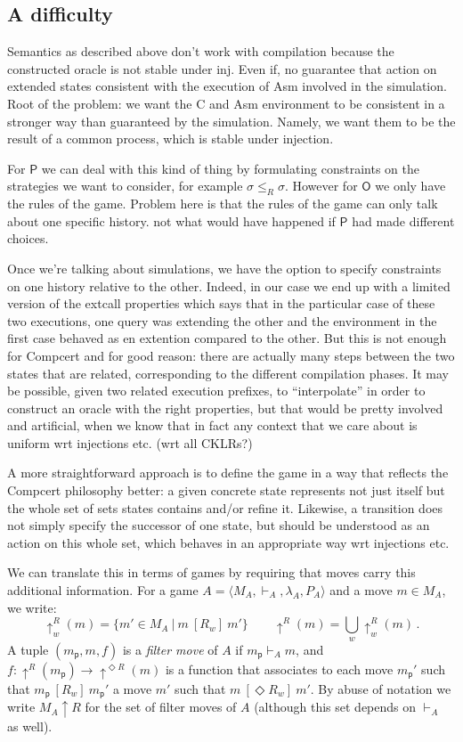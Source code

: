 \documentclass[acmsmall,anonymous]{acmart}
\newcommand{\kw}[1]{\ensuremath{ \textsf{#1} }}
\newcommand{\ifr}[1]{\ [{#1}]\ }
\begin{document}
\subsection{A difficulty}

Semantics as described above
don't work with compilation
because the constructed oracle is not stable under inj.
Even if,
no guarantee that action on extended states consistent
with the execution of Asm involved in the simulation.
Root of the problem:
we want the C and Asm environment
to be consistent in a stronger way than
guaranteed by the simulation.
Namely,
we want them to be the result of a common process,
which is stable under injection.

For \kw{P} we can deal with this kind of thing
by formulating constraints on the strategies we want to consider,
for example $\sigma \le_R \sigma$.
However for \kw{O} we only have the rules of the game.
Problem here is that the rules of the game
can only talk about one specific history.
not what would have happened if \kw{P} had made different choices.

Once we're talking about simulations,
we have the option to specify constraints
on one history relative to the other.
Indeed,
in our case we end up with a limited version
of the extcall properties
which says that in the particular case
of these two executions,
one query was extending the other
and the environment in the first case
behaved as en extention compared to the other.
But this is not enough for Compcert and for good reason:
there are actually many steps between the two states
that are related,
corresponding to the different compilation phases.
It may be possible,
given two related execution prefixes,
to ``interpolate'' in order to construct an oracle
with the right properties,
but that would be pretty involved and artificial,
when we know that in fact any context that we care about
is uniform wrt injections etc.
(wrt all CKLRs?)

A more straightforward approach
is to define the game in a way that reflects
the Compcert philosophy better:
a given concrete state represents not just itself
but the whole set of sets states contains and/or refine it.
Likewise,
a transition does not simply specify the successor of one state,
but should be understood as an action on this whole set,
which behaves in an appropriate way
wrt injections etc.

We can translate this in terms of games
by requiring that moves carry this additional information.
For a game $A = \langle M_A, \vdash_A, \lambda_A, P_A \rangle$
and a move $m \in M_A$,
we write:
\[
  {\uparrow^R_w}(m) = \{ m' \in M_A \ |\ m \ifr{R_w} m' \} \hspace{2em}
  {\uparrow^R}(m) = \bigcup_w {\uparrow^R_w}(m) \,.
\]
A tuple $(m_\kw{p}, m, f)$ is a \emph{filter move} of $A$
if $m_\kw{p} \vdash_A m$,
and $f : {\uparrow^R}(m_\kw{p}) \rightarrow {\uparrow^{\Diamond R}}(m)$
is a function that associates
to each move $m_\kw{p}'$ such that $m_\kw{p} \ifr{R_w} m_\kw{p}'$
a move $m'$ such that $m \ifr{\Diamond R_w} m'$.
By abuse of notation we write $M_A \uparrow R$
for the set of filter moves of $A$
(although this set depends on $\vdash_A$ as well).
\end{document}
